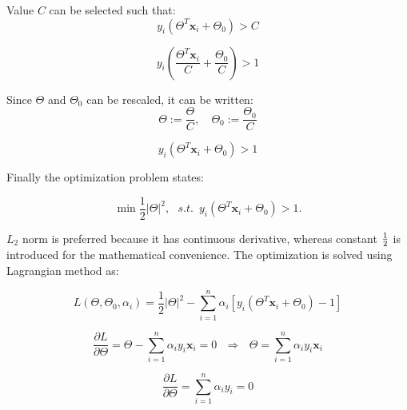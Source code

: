 Value $C$ can be selected such that:
\begin{equation} 
y_i \left(\Theta^T \mathbf{x}_i + \Theta_0\right) > C
\end{equation}

\begin{equation} 
y_i \left(\frac{\Theta^T \mathbf{x}_i}{C} + \frac{\Theta_0}{C}\right) > 1
\end{equation}

Since $\Theta$ and $\Theta_0$ can be rescaled, it can be written:
\begin{equation} 
\Theta := \frac{\Theta}{C}, \,\,\,\,\,\, \Theta_0 := \frac{\Theta_0}{C}
\end{equation}

\begin{equation} 
 y_i \left(\Theta^T \mathbf{x}_i + \Theta_0\right) > 1
\end{equation}

Finally the optimization problem states:

\begin{equation} 
\min \frac{1}{2} \vert \Theta \vert ^2, \,\,\,\, s.t. \,\,\, y_i \left(\Theta^T \mathbf{x}_i + \Theta_0\right) > 1.
\end{equation}

\noindent $L_2$ norm is preferred because it has continuous derivative, whereas constant $\nicefrac{1}{2}$ is introduced for the mathematical convenience. The optimization is solved using Lagrangian method as:

\begin{equation} \label{eq:SVM-opt}
L(\Theta, \Theta_0, \alpha_i) = \frac{1}{2} \vert \Theta \vert ^2 - \sum_{i=1}^n \alpha_i \left[y_i \left(\Theta^T \mathbf{x}_i + \Theta_0\right) - 1\right]
\end{equation}

\begin{equation} \label{eq:SVM-primal}
\frac{\partial L}{\partial \Theta} = \Theta - \sum_{i=1}^n \alpha_i y_i \mathbf{x}_i = 0 \,\,\,\, \Rightarrow \,\,\,\, \Theta = \sum_{i=1}^n \alpha_i y_i \mathbf{x}_i
\end{equation}

\begin{equation} \label{eq:SVM-dual}
\frac{\partial L}{\partial \Theta} = \sum_{i=1}^n \alpha_i y_i = 0
\end{equation}

